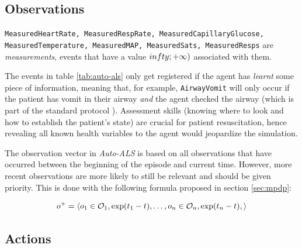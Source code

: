 \newpage
\subsection{Observations}
\label{sec:auto-als-obs}

\texttt{MeasuredHeartRate, MeasuredRespRate, MeasuredCapillaryGlucose, MeasuredTemperature, MeasuredMAP, MeasuredSats, MeasuredResps} are \emph{measurements}, events that have a value $\-infty; +\infty)$ associated with them.

    
The events in table \ref{tab:auto-als} only get registered if the agent has \emph{learnt} some piece of information, meaning that, for example, \verb|AirwayVomit| will only occur if the patient has vomit in their airway \emph{and} the agent checked the airway (which is part of the standard protocol \cite{abcde}).
Assessment skills (knowing where to look and how to establish the patient's state) are crucial for patient resuscitation, hence revealing all known health variables to the agent would jeopardize the simulation.

The observation vector in \emph{Auto-ALS} is based on all observations that have occurred between the beginning of the episode and current time.
However, more recent observations are more likely to still be relevant and should be given priority.
This is done with the following formula proposed in section \ref{sec:mpdp}:

\begin{equation}
     o^{+} = \langle o_1 \in \mathcal{O}_1, \exp(t_1-t), \dots, o_n \in \mathcal{O}_n, \exp(t_n-t), \rangle
\end{equation}

\newpage
\subsection{Actions}
\label{sec:auto-als-act}


